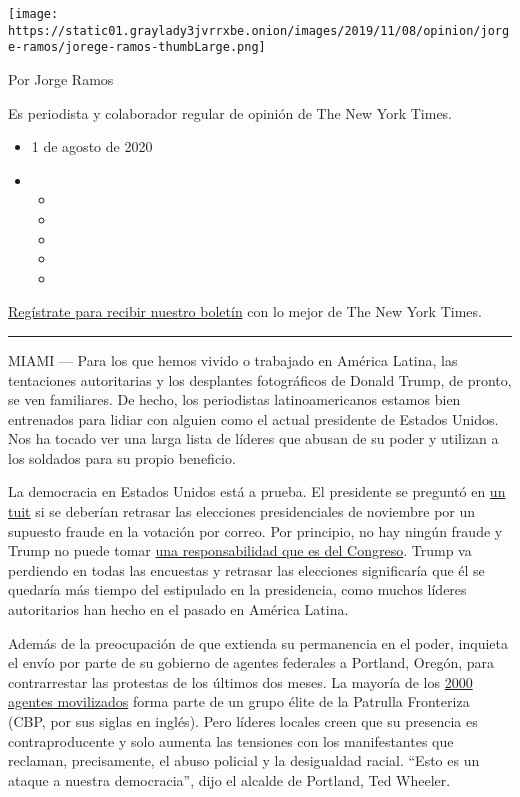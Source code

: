 \texttt{[image: https://static01.graylady3jvrrxbe.onion/images/2019/11/08/opinion/jorge-ramos/jorege-ramos-thumbLarge.png]}

Por Jorge Ramos

Es periodista y colaborador regular de opinión de The New York Times.

\begin{itemize}
\item
  1 de agosto de 2020
\item
  \begin{itemize}
  \item
  \item
  \item
  \item
  \item
  \end{itemize}
\end{itemize}

\href{https://www.nytimes3xbfgragh.onion/newsletters/el-times}{Regístrate
para recibir nuestro boletín} con lo mejor de The New York Times.

\begin{center}\rule{0.5\linewidth}{\linethickness}\end{center}

MIAMI --- Para los que hemos vivido o trabajado en América Latina, las
tentaciones autoritarias y los desplantes fotográficos de Donald Trump,
de pronto, se ven familiares. De hecho, los periodistas latinoamericanos
estamos bien entrenados para lidiar con alguien como el actual
presidente de Estados Unidos. Nos ha tocado ver una larga lista de
líderes que abusan de su poder y utilizan a los soldados para su propio
beneficio.

La democracia en Estados Unidos está a prueba. El presidente se preguntó
en
\href{https://twitter.com/realDonaldTrump/status/1288818160389558273}{un
tuit} si se deberían retrasar las elecciones presidenciales de noviembre
por un supuesto fraude en la votación por correo. Por principio, no hay
ningún fraude y Trump no puede tomar
\href{https://www.nytimes3xbfgragh.onion/es/2020/07/30/espanol/estados-unidos/trump-retrasar-elecciones.html}{una
responsabilidad que es del Congreso}. Trump va perdiendo en todas las
encuestas y retrasar las elecciones significaría que él se quedaría más
tiempo del estipulado en la presidencia, como muchos líderes
autoritarios han hecho en el pasado en América Latina.

Además de la preocupación de que extienda su permanencia en el poder,
inquieta el envío por parte de su gobierno de agentes federales a
Portland, Oregón, para contrarrestar las protestas de los últimos dos
meses. La mayoría de los
\href{https://www.nytimes3xbfgragh.onion/2020/07/17/us/portland-protests.html}{2000
agentes movilizados} forma parte de un grupo élite de la Patrulla
Fronteriza (CBP, por sus siglas en inglés). Pero líderes locales creen
que su presencia es contraproducente y solo aumenta las tensiones con
los manifestantes que reclaman, precisamente, el abuso policial y la
desigualdad racial. ``Esto es un ataque a nuestra democracia'', dijo el
alcalde de Portland, Ted Wheeler.

